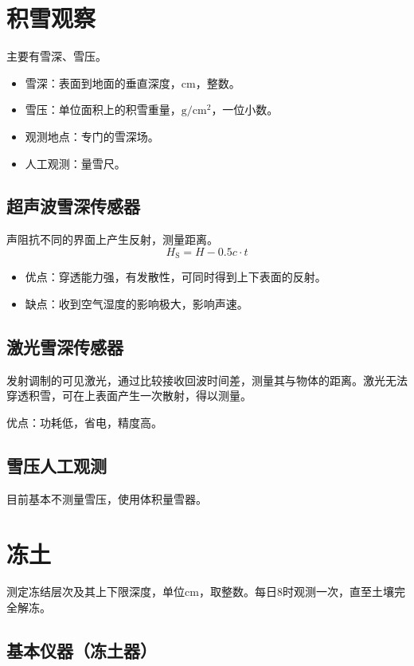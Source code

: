 \documentclass[UTF8,11pt]{ctexbook}
\begin{document}
\section{积雪观察}

主要有雪深、雪压。
\begin{itemize}
    \item 雪深：表面到地面的垂直深度，cm，整数。
    \item 雪压：单位面积上的积雪重量，\(\mathrm{g/cm^2}\)，一位小数。
    \item 观测地点：专门的雪深场。
    \item 人工观测：量雪尺。
\end{itemize}

\subsection{超声波雪深传感器}

声阻抗不同的界面上产生反射，测量距离。
\[
H_\mathrm{S}=H-0.5c\cdot t
\]
\begin{itemize}
    \item 优点：穿透能力强，有发散性，可同时得到上下表面的反射。
    \item 缺点：收到空气湿度的影响极大，影响声速。
\end{itemize}

\subsection{激光雪深传感器}

发射调制的可见激光，通过比较接收回波时间差，测量其与物体的距离。激光无法穿透积雪，可在上表面产生一次散射，得以测量。

优点：功耗低，省电，精度高。

\subsection{雪压人工观测}

目前基本不测量雪压，使用体积量雪器。

\section{冻土}

测定冻结层次及其上下限深度，单位cm，取整数。每日8时观测一次，直至土壤完全解冻。

\subsection{基本仪器（冻土器）}
\end{document}

